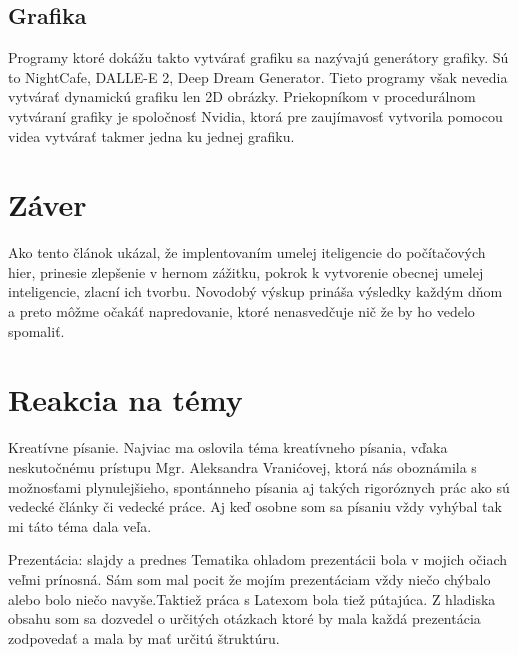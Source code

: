 \documentclass{article}
\begin{document}
\subsection{Grafika}
Programy ktoré dokážu takto vytvárať grafiku sa nazývajú generátory grafiky. Sú to NightCafe, DALLE-E 2, Deep Dream Generator. Tieto programy však nevedia vytvárať dynamickú grafiku len 2D obrázky. Priekopníkom v procedurálnom vytváraní grafiky je spoločnosť Nvidia, ktorá pre zaujímavosť vytvorila pomocou videa vytvárať takmer jedna ku jednej grafiku. 
\section{Záver}
Ako tento článok ukázal, že implentovaním umelej iteligencie do počítačových hier, prinesie zlepšenie v hernom zážitku, pokrok k vytvorenie obecnej umelej inteligencie, zlacní ich tvorbu. Novodobý výskup prináša výsledky každým dňom a preto môžme očakáť napredovanie, ktoré nenasvedčuje nič že by ho vedelo spomaliť.
\section{Reakcia na témy}

Kreatívne písanie.
Najviac ma oslovila téma kreatívneho písania, vďaka neskutočnému prístupu Mgr. Aleksandra Vranićovej, ktorá nás oboznámila s možnosťami plynulejšieho, spontánneho písania aj takých rigoróznych prác ako sú vedecké články či vedecké práce. Aj keď osobne som sa písaniu vždy vyhýbal tak mi táto téma dala veľa. 

Prezentácia: slajdy a prednes
Tematika ohladom prezentácii bola v mojich očiach veľmi prínosná. Sám som mal pocit že mojím prezentáciam vždy niečo chýbalo alebo bolo niečo navyše.Taktiež práca s Latexom bola tiež pútajúca. Z hladiska obsahu som sa dozvedel o určitých otázkach ktoré by mala každá prezentácia zodpovedať a mala by mať určitú štruktúru. 


\end{document}
